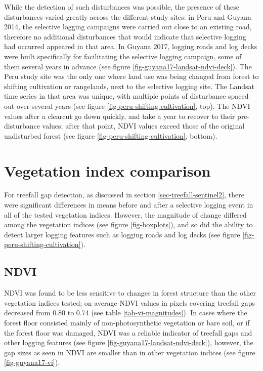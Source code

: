 \documentclass[a4paper,12pt]{scrbook}
\begin{document}
While the detection of such disturbances was possible, the presence of these disturbances varied greatly across the different study sites: in Peru and Guyana 2014, the selective logging campaigns were carried out close to an existing road, therefore no additional disturbances that would indicate that selective logging had occurred appeared in that area. In Guyana 2017, logging roads and log decks were built specifically for facilitating the selective logging campaign, some of them several years in advance (see figure \ref{fig-guyana17-landsat-ndvi-deck}). The Peru study site was the only one where land use was being changed from forest to shifting cultivation or rangelands, next to the selective logging site. The Landsat time series in that area was unique, with multiple points of disturbance spaced out over several years (see figure \ref{fig-peru-shifting-cultivation}, top). The \ac{NDVI} values after a clearcut go down quickly, and take a year to recover to their pre-disturbance values; after that point, \ac{NDVI} values exceed those of the original undisturbed forest (see figure \ref{fig-peru-shifting-cultivation}, bottom).

\section{Vegetation index comparison}

For treefall gap detection, as discussed in section \ref{sec-treefall-sentinel2}, there were significant differences in means before and after a selective logging event in all of the tested vegetation indices. However, the magnitude of change differed among the vegetation indices (see figure \ref{fig-boxplots}), and so did the ability to detect larger logging features such as logging roads and log decks (see figure \ref{fig-peru-shifting-cultivation}).

\subsection{NDVI}

\ac{NDVI} was found to be less sensitive to changes in forest structure than the other vegetation indices tested; on average NDVI values in pixels covering treefall gaps decreased from 0.80 to 0.74 (see table \ref{tab-vi-magnitudes}). In cases where the forest floor consisted mainly of non-photosynthetic vegetation or bare soil, or if the forest floor was damaged, \ac{NDVI} was a reliable indicator of treefall gaps and other logging features (see figure \ref{fig-guyana17-landsat-ndvi-deck}), however, the gap sizes as seen in \ac{NDVI} are smaller than in other vegetation indices (see figure \ref{fig-guyana17-vi}).
\end{document}
